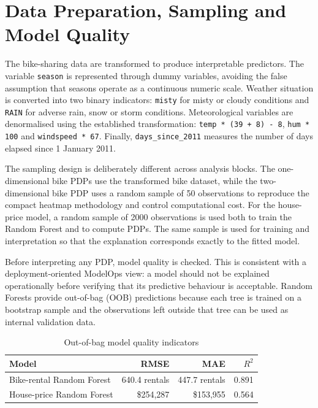 \documentclass[
]{article}
\begin{document}
\section{Data Preparation, Sampling and Model Quality}
\label{data-preparation-sampling-and-model-quality}

The bike-sharing data are transformed to produce interpretable predictors. The variable \texttt{season} is represented through dummy variables, avoiding the false assumption that seasons operate as a continuous numeric scale. Weather situation is converted into two binary indicators: \texttt{misty} for misty or cloudy conditions and \texttt{RAIN} for adverse rain, snow or storm conditions. Meteorological variables are denormalised using the established transformation: \texttt{temp * (39 + 8) - 8}, \texttt{hum * 100} and \texttt{windspeed * 67}. Finally, \texttt{days\_since\_2011} measures the number of days elapsed since 1 January 2011.

The sampling design is deliberately different across analysis blocks. The one-dimensional bike PDPs use the transformed bike dataset, while the two-dimensional bike PDP uses a random sample of 50 observations to reproduce the compact heatmap methodology and control computational cost. For the house-price model, a random sample of 2000 observations is used both to train the Random Forest and to compute PDPs. The same sample is used for training and interpretation so that the explanation corresponds exactly to the fitted model.

Before interpreting any PDP, model quality is checked. This is consistent with a deployment-oriented ModelOps view: a model should not be explained operationally before verifying that its predictive behaviour is acceptable. Random Forests provide out-of-bag (OOB) predictions because each tree is trained on a bootstrap sample and the observations left outside that tree can be used as internal validation data.

\begin{table}[H]
\centering
\caption{Out-of-bag model quality indicators}
\begin{tabular}{lrrr}
\toprule
Model & RMSE & MAE & $R^2$ \\
\midrule
Bike-rental Random Forest & 640.4 rentals & 447.7 rentals & 0.891 \\
House-price Random Forest & \$254,287 & \$153,955 & 0.564 \\
\bottomrule
\end{tabular}
\end{table}
\end{document}
